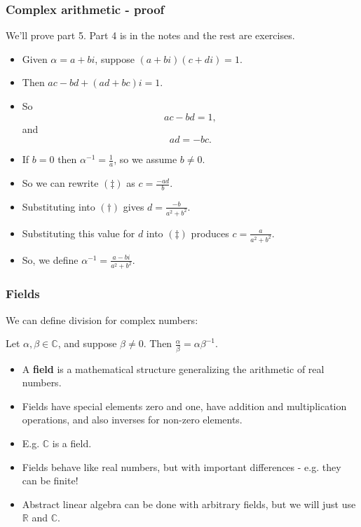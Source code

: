 \documentclass[handout]{beamer}
\newcommand{\bR}{\mathbb{R}}
\newcommand{\bC}{\mathbb{C}}
\begin{document}
\begin{frame}
\frametitle{Complex arithmetic - proof}
We'll prove  part 5. Part 4 is in the notes and the rest are exercises.
\begin{itemize}
\item Given $\alpha = a + bi$, suppose $(a+bi)(c+di) = 1$. 
\item Then $ac - bd + (ad + bc)i = 1$.
\item So 
\[\tag{$\dagger$}ac - bd = 1,\]
and 
\[\tag{$\ddagger$}ad = - bc.\] 
\item If $b = 0 $ then $\alpha^{-1}=\frac{1}{a}$, so we assume $b\neq 0$. 
\item So we can rewrite $(\ddagger)$ as $c = \frac{-ad}{b}$. 
\item Substituting into $(\dagger)$ gives $d = \frac{-b}{a^2+ b^2}$. 
\item Substituting this value for $d$ into $(\ddagger)$ produces $c = \frac{a}{a^2+b^2}$. 
\item So, we define $\alpha^{-1} = \frac{a-bi}{a^2+b^2}$. 
\end{itemize}
\end{frame}


\begin{frame}
\frametitle{Fields}
We can define division for complex numbers:
\begin{definition}
Let $\alpha,\beta\in\bC$, and suppose $\beta\neq 0$. Then $\frac{\alpha}{\beta} = \alpha\beta^{-1}$.
\begin{itemize}
\item A \textbf{field} is a mathematical structure generalizing the arithmetic of real numbers.
\item Fields have special elements zero and one, have addition and multiplication operations, and also inverses for non-zero elements.
\item E.g. $\bC$ is a field.
\item Fields behave like real numbers, but with important differences - e.g. they can be finite!
\item Abstract linear algebra can be done with arbitrary fields, but we will just use $\bR$ and $\bC$.
\end{itemize}
\end{definition}
\end{frame}
\end{document}
